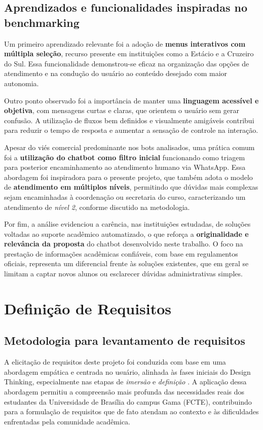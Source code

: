 \subsection{Aprendizados e funcionalidades inspiradas no benchmarking}

Um primeiro aprendizado relevante foi a adoção de \textbf{menus interativos com múltipla seleção}, recurso presente em instituições como a Estácio e a Cruzeiro do Sul. Essa funcionalidade demonstrou-se eficaz na organização das opções de atendimento e na condução do usuário ao conteúdo desejado com maior autonomia.

Outro ponto observado foi a importância de manter uma \textbf{linguagem acessível e objetiva}, com mensagens curtas e claras, que orientem o usuário sem gerar confusão. A utilização de fluxos bem definidos e visualmente amigáveis contribui para reduzir o tempo de resposta e aumentar a sensação de controle na interação.

Apesar do viés comercial predominante nos bots analisados, uma prática comum foi a \textbf{utilização do chatbot como filtro inicial} funcionando como triagem para posterior encaminhamento ao atendimento humano via WhatsApp. Essa abordagem foi inspiradora para o presente projeto, que também adota o modelo de \textbf{atendimento em múltiplos níveis}, permitindo que dúvidas mais complexas sejam encaminhadas à coordenação ou secretaria do curso, caracterizando um atendimento de \textit{nível 2}, conforme discutido na metodologia.

Por fim, a análise evidenciou a carência, nas instituições estudadas, de soluções voltadas ao suporte acadêmico automatizado, o que reforça a \textbf{originalidade e relevância da proposta} do chatbot desenvolvido neste trabalho. O foco na prestação de informações acadêmicas confiáveis, com base em regulamentos oficiais, representa um diferencial frente às soluções existentes, que em geral se limitam a captar novos alunos ou esclarecer dúvidas administrativas simples.

\section{Definição de Requisitos}

\subsection{Metodologia para levantamento de requisitos}

A elicitação de requisitos deste projeto foi conduzida com base em uma abordagem empática e centrada no usuário, alinhada às fases iniciais do Design Thinking, especialmente nas etapas de \textit{imersão} e \textit{definição} \cite{brown2009change}. A aplicação dessa abordagem permitiu a compreensão mais profunda das necessidades reais dos estudantes da Universidade de Brasília do campus Gama (FCTE), contribuindo para a formulação de requisitos que de fato atendam ao contexto e às dificuldades enfrentadas pela comunidade acadêmica.

